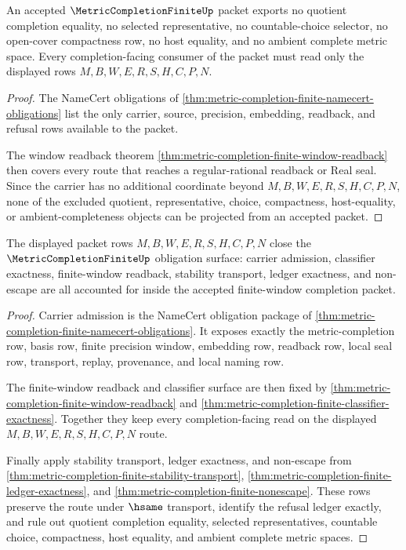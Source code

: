 \begin{theorem}
\label{thm:metric-completion-finite-nonescape}
An accepted $\MetricCompletionFiniteUp$ packet exports no quotient completion equality, no selected representative, no countable-choice selector, no open-cover compactness row, no host equality, and no ambient complete metric space. Every completion-facing consumer of the packet must read only the displayed rows $M,B,W,E,R,S,H,C,P,N$.
\end{theorem}
\begin{proof}
The NameCert obligations of \autoref{thm:metric-completion-finite-namecert-obligations} list the only carrier, source, precision, embedding, readback, and refusal rows available to the packet.

The window readback theorem \autoref{thm:metric-completion-finite-window-readback} then covers every route that reaches a regular-rational readback or Real seal. Since the carrier has no additional coordinate beyond $M,B,W,E,R,S,H,C,P,N$, none of the excluded quotient, representative, choice, compactness, host-equality, or ambient-completeness objects can be projected from an accepted packet.
\end{proof}

\begin{theorem}
\label{thm:metric-completion-finite-obligation-closure}
The displayed packet rows $M,B,W,E,R,S,H,C,P,N$ close the $\MetricCompletionFiniteUp$ obligation surface: carrier admission, classifier exactness, finite-window readback, stability transport, ledger exactness, and non-escape are all accounted for inside the accepted finite-window completion packet.
\end{theorem}
\begin{proof}
Carrier admission is the NameCert obligation package of \autoref{thm:metric-completion-finite-namecert-obligations}. It exposes exactly the metric-completion row, basis row, finite precision window, embedding row, readback row, local seal row, transport, replay, provenance, and local naming row.

The finite-window readback and classifier surface are then fixed by \autoref{thm:metric-completion-finite-window-readback} and \autoref{thm:metric-completion-finite-classifier-exactness}. Together they keep every completion-facing read on the displayed $M,B,W,E,R,S,H,C,P,N$ route.

Finally apply stability transport, ledger exactness, and non-escape from \autoref{thm:metric-completion-finite-stability-transport}, \autoref{thm:metric-completion-finite-ledger-exactness}, and \autoref{thm:metric-completion-finite-nonescape}. These rows preserve the route under $\hsame$ transport, identify the refusal ledger exactly, and rule out quotient completion equality, selected representatives, countable choice, compactness, host equality, and ambient complete metric spaces.
\end{proof}

